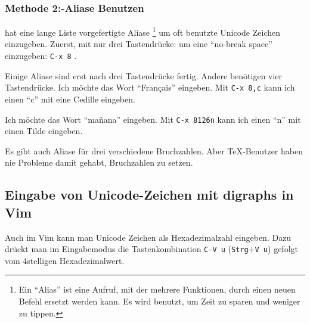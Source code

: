\subsubsection*{Methode 2:\enspace {}-Aliase Benutzen}
 hat eine lange Liste vorgefertigte Aliase%
\footnote{Ein \enquote{Alias} ist eine Aufruf, mit der
mehrere Funktionen, durch einen neuen Befehl ersetzt werden kann.
Es wird benutzt, um Zeit zu sparen und weniger zu tippen.}
um oft benutzte Unicode Zeichen einzugeben. Zuerst, mit nur
drei Tastendrücke: um eine \enquote{no-break space} einzugeben: %
\texttt{C-x 8}
.

Einige Aliase sind erst nach drei Tastendrücke fertig. Andere
benötigen vier Tastendrücke. Ich möchte das Wort \enquote{Français}
eingeben. Mit %
\texttt{C-x 8}\texttt{,c}
kann ich einen \enquote{c} mit eine Cedille eingeben.

Ich möchte das Wort \enquote{mañana} eingeben. Mit %
\texttt{C-x 8}\texttt{\char126n}
kann ich einen \enquote{n} mit einen Tilde eingeben.

Es gibt auch Aliase für drei verschiedene Bruchzahlen. Aber
\TeX{}-Benutzer haben nie Probleme damit gehabt, Bruchzahlen
zu setzen.



\subsection{Eingabe von Unicode-Zeichen mit digraphs in Vim}
\label{unicodeviavim}

Auch im Vim kann man Unicode Zeichen als Hexadezimalzahl eingeben.
Dazu drückt man im Eingabemodus die Tastenkombination \lstinline/C-V u/ (\texttt{Strg}$+$\texttt{V u})
gefolgt vom 4stelligen Hexadezimalwert.

